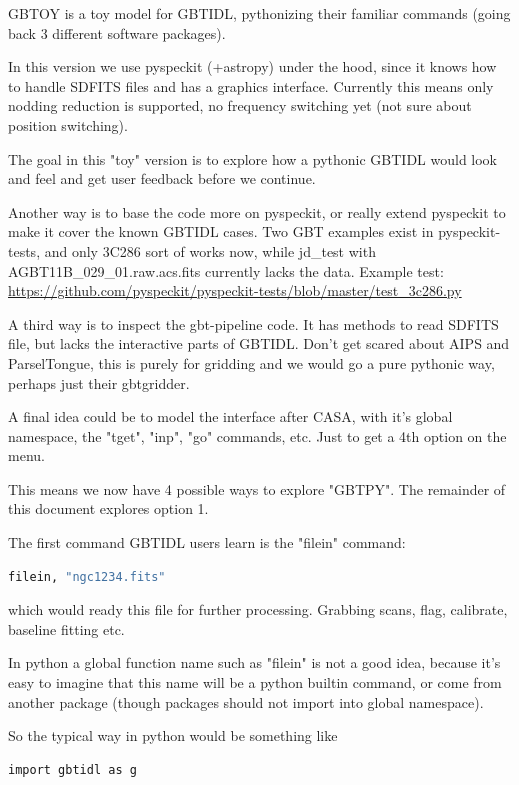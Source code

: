 \documentclass[12pt,a4paper]{article}
\begin{document}
GBTOY is a toy model for GBTIDL, pythonizing their familiar commands
(going back 3 different software packages).

In this version we use pyspeckit (+astropy) under the hood, since it
knows how to handle SDFITS files and has a graphics
interface. Currently this means only nodding reduction is supported,
no frequency switching yet (not sure about position switching).

The goal in this "toy" version is to explore how a pythonic GBTIDL would
look and feel and get user feedback before we continue.

Another way is to base the code more on pyspeckit, or really extend
pyspeckit to make it cover the known GBTIDL cases.  Two GBT examples
exist in pyspeckit-tests, and only 3C286 sort of works now, while
jd\_test with AGBT11B\_029\_01.raw.acs.fits currently lacks the data.
Example test:  \url{https://github.com/pyspeckit/pyspeckit-tests/blob/master/test_3c286.py}

A third way is to inspect the gbt-pipeline code. It has methods to
read SDFITS file, but lacks the interactive parts of GBTIDL.  Don't
get scared about AIPS and ParselTongue, this is purely for gridding and
we would go a pure pythonic way, perhaps just their gbtgridder.


A final idea could be to model the interface after CASA, with it's
global namespace, the "tget", "inp", "go" commands, etc. Just to get
a 4th option on the menu.


This means we now have 4 possible ways to explore "GBTPY". The remainder
of this document explores option 1.




The first command GBTIDL users learn is the "filein" command:

\begin{lstlisting}[language=bash]
    filein, "ngc1234.fits"
\end{lstlisting}

which would ready this file for further processing. Grabbing scans,
flag, calibrate, baseline fitting etc.


In python a global function name such as "filein" is not a good idea,
because it's easy to imagine that this name will be a python builtin
command, or come from another package (though packages should not
import into global namespace).

So the typical way in python would be something like

\begin{lstlisting}[language=bash]
   import gbtidl as g
\end{lstlisting}
\end{document}
